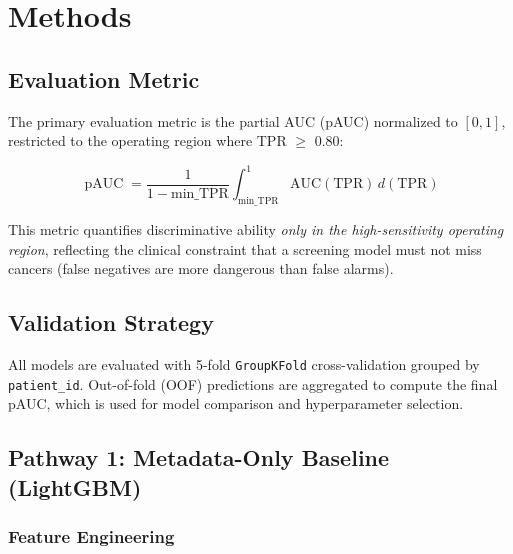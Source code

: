 \documentclass[12pt, a4paper]{article}
\DeclareMathOperator{\pAUC}{pAUC}
\begin{document}
\section{Methods}
\label{sec:methods}

\subsection{Evaluation Metric}
\label{sec:metrics}

The primary evaluation metric is the partial AUC (pAUC) normalized to $[0, 1]$,
restricted to the operating region where TPR $\geq$ 0.80:

\begin{equation}
    \pAUC = \frac{1}{1 - \text{min\_TPR}}
              \int_{\text{min\_TPR}}^{1}
              \text{AUC}(\text{TPR}) \, d(\text{TPR})
    \label{eq:pauc}
\end{equation}

This metric quantifies discriminative ability \emph{only in the high-sensitivity
operating region}, reflecting the clinical constraint that a screening model
must not miss cancers (false negatives are more dangerous than false alarms).

\subsection{Validation Strategy}

All models are evaluated with 5-fold \texttt{GroupKFold} cross-validation
grouped by \texttt{patient\_id}. Out-of-fold (OOF) predictions are aggregated
to compute the final pAUC, which is used for model comparison and
hyperparameter selection.

\subsection{Pathway 1: Metadata-Only Baseline (LightGBM)}

\subsubsection{Feature Engineering}
\end{document}

